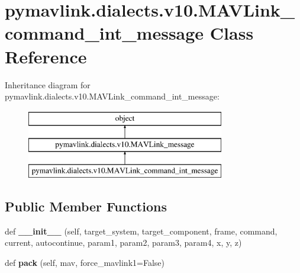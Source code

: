 \hypertarget{classpymavlink_1_1dialects_1_1v10_1_1MAVLink__command__int__message}{}\section{pymavlink.\+dialects.\+v10.\+M\+A\+V\+Link\+\_\+command\+\_\+int\+\_\+message Class Reference}
\label{classpymavlink_1_1dialects_1_1v10_1_1MAVLink__command__int__message}
Inheritance diagram for pymavlink.\+dialects.\+v10.\+M\+A\+V\+Link\+\_\+command\+\_\+int\+\_\+message\+:\begin{figure}[H]
\begin{center}
\leavevmode
\includegraphics[height=3.000000cm]{classpymavlink_1_1dialects_1_1v10_1_1MAVLink__command__int__message}
\end{center}
\end{figure}
\subsection*{Public Member Functions}
\begin{DoxyCompactItemize}
\item 
\mbox{\label{classpymavlink_1_1dialects_1_1v10_1_1MAVLink__command__int__message_acaf6605dc6fb87e54d307e771d3351d7}} 
def {\bfseries \+\_\+\+\_\+init\+\_\+\+\_\+} (self, target\+\_\+system, target\+\_\+component, frame, command, current, autocontinue, param1, param2, param3, param4, x, y, z)
\item 
\mbox{\label{classpymavlink_1_1dialects_1_1v10_1_1MAVLink__command__int__message_ad0af77624bca3067fa381a9d910b3597}} 
def {\bfseries pack} (self, mav, force\+\_\+mavlink1=False)
\end{DoxyCompactItemize}

